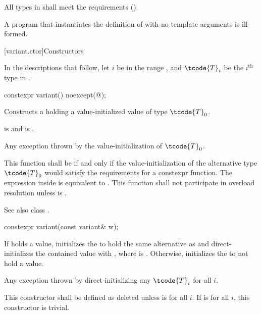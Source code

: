 \pnum
All types in  shall meet
the  requirements ().

\pnum
A program that instantiates the definition of  with
no template arguments is ill-formed.

[variant.ctor]{Constructors}

\pnum
In the descriptions that follow, let $i$ be in the range ,
and $\tcode{T}_i$ be the $i^\text{th}$ type in .

%
\begin{itemdecl}
constexpr variant() noexcept(@\seebelow@);
\end{itemdecl}

\begin{itemdescr}
\pnum
\effects
Constructs a  holding a value-initialized value of type $\tcode{T}_0$.

\pnum
\ensures
{} is  and  is .

\pnum
\throws
Any exception thrown by the value-initialization of $\tcode{T}_0$.

\pnum
\remarks
This function shall be  if and only if the
value-initialization of the alternative type $\tcode{T}_0$ would satisfy the
requirements for a constexpr function.
The expression inside  is equivalent to
.
This function shall not participate in overload resolution unless
 is .
\begin{note}
See also class .
\end{note}
\end{itemdescr}

%
\begin{itemdecl}
constexpr variant(const variant& w);
\end{itemdecl}

\begin{itemdescr}
\pnum
\effects
If  holds a value, initializes the  to hold the same
alternative as  and direct-initializes the contained value
with , where  is .
Otherwise, initializes the  to not hold a value.

\pnum
\throws
Any exception thrown by direct-initializing any $\tcode{T}_i$ for all $i$.

\pnum
\remarks
This constructor shall be defined as deleted unless
 is  for all $i$.
If 
is  for all $i$, this constructor is trivial.
\end{itemdescr}

